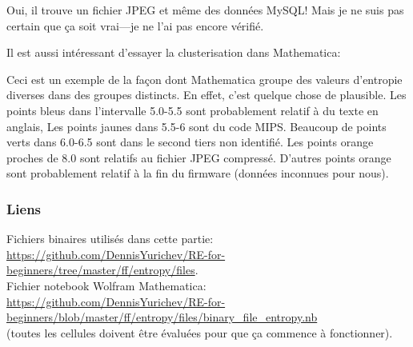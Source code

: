 Oui, il trouve un fichier JPEG et même des données MySQL!
Mais je ne suis pas certain que ça soit vrai---je ne l'ai pas encore vérifié.

Il est aussi intéressant d'essayer la clusterisation dans Mathematica:



Ceci est un exemple de la façon dont Mathematica groupe des valeurs d'entropie diverses
dans des groupes distincts.
En effet, c'est quelque chose de plausible.
Les points bleus dans l'intervalle 5.0-5.5 sont probablement relatif à du texte en
anglais,
Les points jaunes dans 5.5-6 sont du code MIPS. Beaucoup de points verts dans 6.0-6.5
sont dans le second tiers non identifié.
Les points orange proches de 8.0 sont relatifs au fichier JPEG compressé.
D'autres points orange sont probablement relatif à la fin du firmware (données inconnues
pour nous).

\subsubsection{Liens}

Fichiers binaires utilisés dans cette partie: \\
\url{https://github.com/DennisYurichev/RE-for-beginners/tree/master/ff/entropy/files}.\\
Fichier notebook Wolfram Mathematica: \\
\url{https://github.com/DennisYurichev/RE-for-beginners/blob/master/ff/entropy/files/binary_file_entropy.nb} \\
(toutes les cellules doivent être évaluées pour que ça commence à fonctionner).
